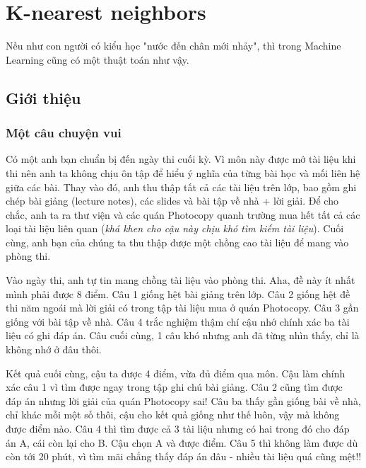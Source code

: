 \chapter{K-nearest neighbors}

 
 
Nếu như con người có kiểu học "nước đến chân mới nhảy", thì trong Machine Learning cũng có một thuật toán như vậy.  
 

 
\section{Giới thiệu}
 
 
\subsection{Một câu chuyện vui}
 
Có một anh bạn chuẩn bị đến ngày thi cuối kỳ. Vì môn này được mở tài liệu khi thi nên anh ta không chịu ôn tập để hiểu ý nghĩa của từng bài học và mối liên hệ giữa các bài. Thay vào đó, anh thu thập tất cả các tài liệu trên lớp, bao gồm ghi chép bài giảng (lecture notes), các slides và bài tập về nhà + lời giải. Để cho chắc, anh ta ra thư viện và các quán Photocopy quanh trường mua hết tất cả các loại tài liệu liên quan (\textit{khá khen cho cậu này chịu khó tìm kiếm tài liệu}). Cuối cùng, anh bạn của chúng ta thu thập được một chồng cao tài liệu để mang vào phòng thi.  
 
Vào ngày thi, anh tự tin mang chồng tài liệu vào phòng thi. Aha, đề này ít nhất mình phải được 8 điểm. Câu 1 giống hệt bài giảng trên lớp. Câu 2 giống hệt đề thi năm ngoái mà lời giải có trong tập tài liệu mua ở quán Photocopy. Câu 3 gần giống với bài tập về nhà. Câu 4 trắc nghiệm thậm chí cậu nhớ chính xác ba tài liệu có ghi đáp án. Câu cuối cùng, 1 câu khó nhưng anh đã từng nhìn thấy, chỉ là không nhớ ở đâu thôi. 
 
Kết quả cuối cùng, cậu ta được 4 điểm, vừa đủ điểm qua môn. Cậu làm chính xác câu 1 vì tìm được ngay trong tập ghi chú bài giảng. Câu 2 cũng tìm được đáp án nhưng lời giải của quán Photocopy sai! Câu ba thấy gần giống bài về nhà, chỉ khác mỗi một số thôi, cậu cho kết quả giống như thế luôn, vậy mà không được điểm nào. Câu 4 thì tìm được cả 3 tài liệu nhưng có hai trong đó cho đáp án A, cái còn lại cho B. Cậu chọn A và được điểm. Câu 5 thì không làm được dù còn tới 20 phút, vì tìm mãi chẳng thấy đáp án đâu - nhiều tài liệu quá cũng mệt!! 
 
